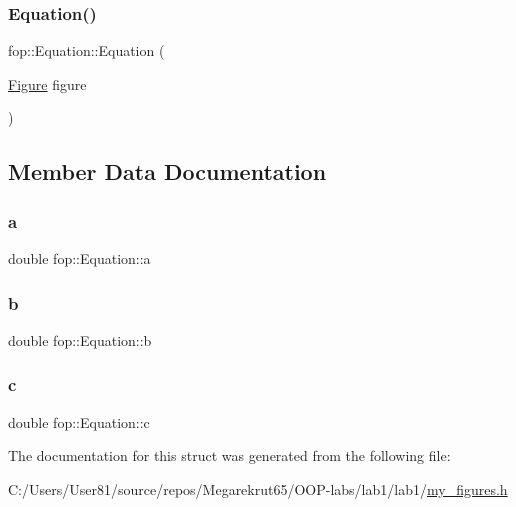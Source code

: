\mbox{\label{structfop_1_1_equation_a93886a166390114aa62609af6ddd1d72}} 
\subsubsection{\texorpdfstring{Equation()}{Equation()}\hspace{0.1cm}{\footnotesize\ttfamily [2/2]}}
{\footnotesize\ttfamily fop\+::\+Equation\+::\+Equation (\begin{DoxyParamCaption}\item[{\mbox{\hyperlink{classfop_1_1_figure}{Figure}}}]{figure }\end{DoxyParamCaption})}



\subsection{Member Data Documentation}
\mbox{\label{structfop_1_1_equation_a9cc4610dcc3a68de1def70a8573cf75f}} 
\subsubsection{\texorpdfstring{a}{a}}
{\footnotesize\ttfamily double fop\+::\+Equation\+::a}

\mbox{\label{structfop_1_1_equation_a6bf704c5c87c9a321c18869f634a5ff1}} 
\subsubsection{\texorpdfstring{b}{b}}
{\footnotesize\ttfamily double fop\+::\+Equation\+::b}

\mbox{\label{structfop_1_1_equation_a795ea1202f12b407544c305d79e39872}} 
\subsubsection{\texorpdfstring{c}{c}}
{\footnotesize\ttfamily double fop\+::\+Equation\+::c}



The documentation for this struct was generated from the following file\+:\begin{DoxyCompactItemize}
\item 
C\+:/\+Users/\+User81/source/repos/\+Megarekrut65/\+O\+O\+P-\/labs/lab1/lab1/\mbox{\hyperlink{my__figures_8h}{my\+\_\+figures.\+h}}\end{DoxyCompactItemize}
